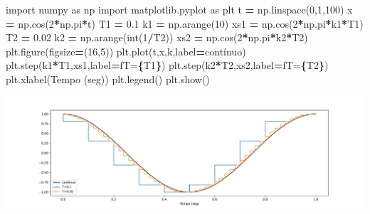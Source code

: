 \documentclass[
]{book}
\newenvironment{Shaded}{\begin{snugshade}}{\end{snugshade}}
\newcommand{\BuiltInTok}[1]{#1}
\newcommand{\DecValTok}[1]{\textcolor[rgb]{0.00,0.00,0.81}{#1}}
\newcommand{\FloatTok}[1]{\textcolor[rgb]{0.00,0.00,0.81}{#1}}
\newcommand{\ImportTok}[1]{#1}
\newcommand{\NormalTok}[1]{#1}
\newcommand{\OperatorTok}[1]{\textcolor[rgb]{0.81,0.36,0.00}{\textbf{#1}}}
\newcommand{\SpecialCharTok}[1]{\textcolor[rgb]{0.81,0.36,0.00}{\textbf{#1}}}
\newcommand{\SpecialStringTok}[1]{\textcolor[rgb]{0.31,0.60,0.02}{#1}}
\newcommand{\StringTok}[1]{\textcolor[rgb]{0.31,0.60,0.02}{#1}}
\begin{document}
\begin{Shaded}
\begin{Highlighting}[]
\ImportTok{import}\NormalTok{ numpy }\ImportTok{as}\NormalTok{ np}
\ImportTok{import}\NormalTok{ matplotlib.pyplot }\ImportTok{as}\NormalTok{ plt}
\NormalTok{t }\OperatorTok{=}\NormalTok{ np.linspace(}\DecValTok{0}\NormalTok{,}\DecValTok{1}\NormalTok{,}\DecValTok{100}\NormalTok{)}
\NormalTok{x }\OperatorTok{=}\NormalTok{ np.cos(}\DecValTok{2}\OperatorTok{*}\NormalTok{np.pi}\OperatorTok{*}\NormalTok{t)}
\NormalTok{T1 }\OperatorTok{=} \FloatTok{0.1}
\NormalTok{k1 }\OperatorTok{=}\NormalTok{ np.arange(}\DecValTok{10}\NormalTok{)}
\NormalTok{xs1 }\OperatorTok{=}\NormalTok{ np.cos(}\DecValTok{2}\OperatorTok{*}\NormalTok{np.pi}\OperatorTok{*}\NormalTok{k1}\OperatorTok{*}\NormalTok{T1)}
\NormalTok{T2 }\OperatorTok{=} \FloatTok{0.02}
\NormalTok{k2 }\OperatorTok{=}\NormalTok{ np.arange(}\BuiltInTok{int}\NormalTok{(}\DecValTok{1}\OperatorTok{/}\NormalTok{T2))}
\NormalTok{xs2 }\OperatorTok{=}\NormalTok{ np.cos(}\DecValTok{2}\OperatorTok{*}\NormalTok{np.pi}\OperatorTok{*}\NormalTok{k2}\OperatorTok{*}\NormalTok{T2)}
\NormalTok{plt.figure(figsize}\OperatorTok{=}\NormalTok{(}\DecValTok{16}\NormalTok{,}\DecValTok{5}\NormalTok{))}
\NormalTok{plt.plot(t,x,}\StringTok{\textquotesingle{}k\textquotesingle{}}\NormalTok{,label}\OperatorTok{=}\StringTok{\textquotesingle{}contínuo\textquotesingle{}}\NormalTok{)}
\NormalTok{plt.step(k1}\OperatorTok{*}\NormalTok{T1,xs1,label}\OperatorTok{=}\SpecialStringTok{f\textquotesingle{}T=}\SpecialCharTok{\{}\NormalTok{T1}\SpecialCharTok{\}}\SpecialStringTok{\textquotesingle{}}\NormalTok{)}
\NormalTok{plt.step(k2}\OperatorTok{*}\NormalTok{T2,xs2,label}\OperatorTok{=}\SpecialStringTok{f\textquotesingle{}T=}\SpecialCharTok{\{}\NormalTok{T2}\SpecialCharTok{\}}\SpecialStringTok{\textquotesingle{}}\NormalTok{)}
\NormalTok{plt.xlabel(}\StringTok{\textquotesingle{}Tempo (seg)\textquotesingle{}}\NormalTok{)}
\NormalTok{plt.legend()}
\NormalTok{plt.show()}
\end{Highlighting}
\end{Shaded}

\includegraphics{_main_files/figure-latex/unnamed-chunk-51-3.pdf}
\end{document}
